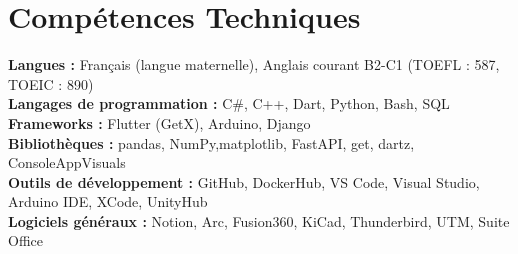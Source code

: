 \documentclass[letterpaper,11pt]{article}
\begin{document}
\section{Compétences Techniques}
 \begin{itemize}[leftmargin=0.15in, label={}]
    \small{\item{
     \textbf{Langues :}{ Français (langue maternelle), Anglais courant B2-C1 (TOEFL : 587, TOEIC : 890)} \\
     \textbf{Langages de programmation :}{ C\#, C++, Dart, Python, Bash, SQL} \\
     \textbf{Frameworks :}{ Flutter (GetX), Arduino, Django} \\
     \textbf{Bibliothèques :}{ pandas, NumPy,matplotlib, FastAPI, get, dartz, ConsoleAppVisuals} \\
     \textbf{Outils de développement :}{ GitHub, DockerHub, VS Code, Visual Studio, Arduino IDE, XCode, UnityHub} \\
     \textbf{Logiciels généraux :}{ Notion, Arc, Fusion360, KiCad, Thunderbird, UTM, Suite Office}
    }}
 \end{itemize}
\end{document}
